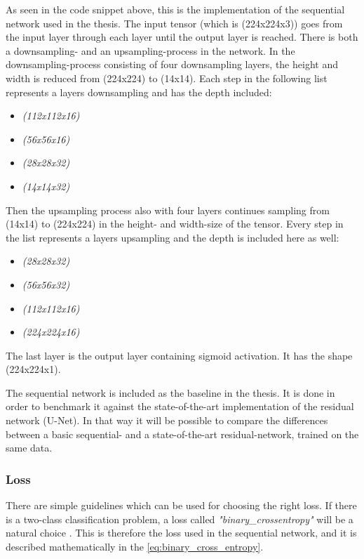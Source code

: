\documentclass[USenglish]{ifimaster}  %
\begin{document}
As seen in the code snippet above, this is the implementation of the sequential network used in the thesis. The input tensor (which is (224x224x3)) goes from the input layer through each layer until the output layer is reached. 
There is both a downsampling- and an upsampling-process in the network. In the downsampling-process consisting of four downsampling layers, the height and width is reduced from (224x224) to (14x14). Each step in the following list represents a layers downsampling and has the depth included:
\begin{itemize}
    \item \textit{(112x112x16)}
    \item \textit{(56x56x16)}
    \item \textit{(28x28x32)}
    \item \textit{(14x14x32)}
\end{itemize}
Then the upsampling process also with four layers continues sampling from (14x14) to (224x224) in the height- and width-size of the tensor. Every step in the list represents a layers upsampling and the depth is included here as well:
\begin{itemize}
    \item \textit{(28x28x32)}
    \item \textit{(56x56x32)}
    \item \textit{(112x112x16)}
    \item \textit{(224x224x16)}
\end{itemize}
The last layer is the output layer containing sigmoid activation. It has the shape (224x224x1).

The sequential network is included as the baseline in the thesis. It is done in order to benchmark it against the state-of-the-art implementation of the residual network (U-Net). In that way it will be possible to compare the differences between a basic sequential- and a state-of-the-art residual-network, trained on the same data.
\subsubsection{Loss}
There are simple guidelines which can be used for choosing the right loss. If there is a two-class classification problem, a loss called \textit{"binary\_crossentropy"} will be a natural choice \cite{Francois_Deep_learning_with_python}. This is therefore the loss used in the sequential network, and it is described mathematically in the \cref{eq:binary_cross_entropy}.
\end{document}
